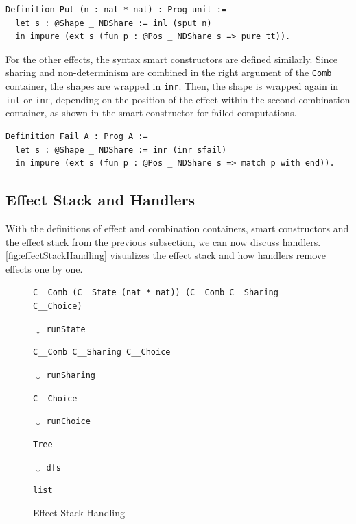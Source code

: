 \documentclass[a4paper, 11pt, fleqn, twoside, abstract=on]{scrreprt}
\newcommand{\cinl}[1]{\texttt{#1}}
\begin{document}
\begin{verbatim}
Definition Put (n : nat * nat) : Prog unit :=
  let s : @Shape _ NDShare := inl (sput n)
  in impure (ext s (fun p : @Pos _ NDShare s => pure tt)).
\end{verbatim}

For the other effects, the syntax smart constructors are defined similarly.
Since sharing and non-determinism are combined in the right argument of the \cinl{Comb} container, the shapes are wrapped in \cinl{inr}.
Then, the shape is wrapped again in \cinl{inl} or \cinl{inr}, depending on the position of the effect within the second combination container, as shown in the smart constructor for failed computations.

\begin{verbatim}
Definition Fail A : Prog A :=
  let s : @Shape _ NDShare := inr (inr sfail)
  in impure (ext s (fun p : @Pos _ NDShare s => match p with end)).
\end{verbatim}

\subsection{Effect Stack and Handlers}
\label{subsec:effectstack}

With the definitions of effect and combination containers, smart constructors and the effect stack from the previous subsection, we can now discuss handlers.
\autoref{fig:effectStackHandling} visualizes the effect stack and how handlers remove effects one by one.

\begin{figure}[H]
{\centering \cinl{C__Comb (C__State (nat * nat)) (C__Comb C__Sharing C__Choice)} \par}

\hspace*{.48\textwidth} {\Large \boldmath $\downarrow$} \texttt{runState}

{\centering \cinl{C__Comb C__Sharing C__Choice} \par}

\hspace*{.48\textwidth} {\Large \boldmath $\downarrow$} \texttt{runSharing}

{\centering \cinl{C__Choice} \par}

\hspace*{.48\textwidth} {\Large \boldmath $\downarrow$} \texttt{runChoice}

{\centering \cinl{Tree} \par}

\hspace*{.48\textwidth} {\Large \boldmath $\downarrow$} \texttt{dfs}

{\centering \cinl{list} \par}
\caption{Effect Stack Handling}
\label{fig:effectStackHandling}
\end{figure}
\end{document}
